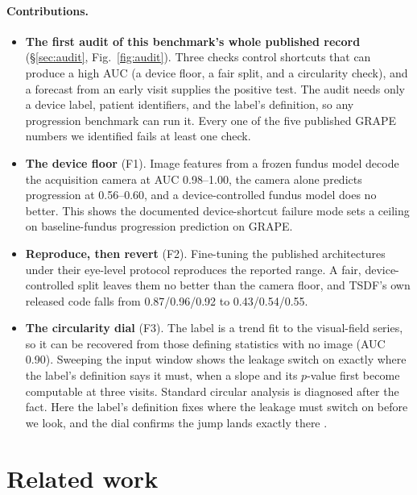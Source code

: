 \paragraph{Contributions.}
\begin{itemize}[leftmargin=1.2em, itemsep=1pt, topsep=1pt]
\item \textbf{The first audit of this benchmark's whole published record} (\S\ref{sec:audit}, Fig.~\ref{fig:audit}).
  Three checks control shortcuts that can produce a high AUC (a device floor, a fair split, and a circularity check), and a
  forecast from an early visit supplies the positive test. The audit needs only a device label, patient identifiers, and
  the label's definition, so any progression benchmark can run it. Every one of the five published GRAPE numbers we
  identified fails at least one check.
\item \textbf{The device floor} (F1). Image features from a frozen fundus model decode the acquisition camera at AUC
  \num{0.98}--\num{1.00}, the camera alone predicts progression at \num{0.56}--\num{0.60}, and a device-controlled fundus
  model does no better. This shows the documented device-shortcut failure mode sets a ceiling on baseline-fundus
  progression prediction on GRAPE.
\item \textbf{Reproduce, then revert} (F2). Fine-tuning the published architectures under their eye-level protocol
  reproduces the reported range. A fair, device-controlled split leaves them no better than the camera floor, and TSDF's
  own released code falls from \num{0.87}/\num{0.96}/\num{0.92} to \num{0.43}/\num{0.54}/\num{0.55}.
\item \textbf{The circularity dial} (F3). The label is a trend fit to the visual-field series, so it can be recovered
  from those defining statistics with no image (AUC \num{0.90}). Sweeping the input window shows the leakage switch on
  exactly where the label's definition says it must, when a slope and its $p$-value first become computable at three
  visits. Standard circular analysis is diagnosed after the fact. Here the label's definition fixes where the leakage
  must switch on before we look, and the dial confirms the jump lands exactly there \citep{kriegeskorte2009circular}.
\end{itemize}

\section{Related work}
\label{sec:related}

